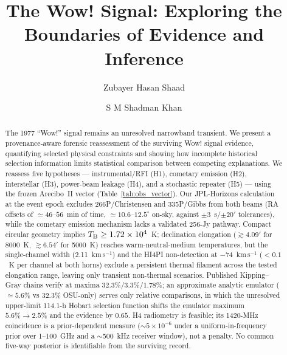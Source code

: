 \documentclass[twocolumn]{aastex701}
\newcommand{\tbeq}{T_{\rm B}}
\begin{document}
\title{The Wow! Signal: Exploring the Boundaries of Evidence and Inference}


\author[sname=Shaad,gname=Zubayer,orcid=0009-0002-2322-8553]{Zubayer Hasan Shaad}

\author[sname=Shadman,gname=Khan,orcid=0009-0009-8153-6352]{S M Shadman Khan}


\begin{abstract}
The 1977 ``Wow!'' signal remains an unresolved narrowband transient. We present a provenance-aware forensic reassessment of the surviving Wow! signal evidence, quantifying selected physical constraints and showing how incomplete historical selection information limits statistical comparison between competing explanations. We reassess five hypotheses --- instrumental/RFI (H1), cometary emission (H2), interstellar  (H3), power-beam leakage (H4), and a stochastic repeater (H5) --- using the frozen Arecibo~II vector \citep{mendez2025} (Table~\ref{tab:obs_vector}). Our JPL-Horizons calculation at the event epoch excludes 266P/Christensen and 335P/Gibbs from both beams (RA offsets of $\simeq46$--$56$~min of time, $\simeq10.6$--$12.5^\circ$ on-sky, against $\pm3$~s/$\pm20'$ tolerances), while the cometary emission mechanism lacks a validated 256-Jy pathway. Compact circular geometry implies $\tbeq\geq1.72\times10^4$~K; declination elongation ($\gtrsim4.09'$ for 8000~K, $\gtrsim6.54'$ for 5000~K) reaches warm-neutral-medium temperatures, but the single-channel width (2.11~km\,s$^{-1}$) and the HI4PI non-detection at $-74$~km\,s$^{-1}$ ($<0.1$~K per channel at both horns) exclude a persistent thermal filament across the tested elongation range, leaving only transient non-thermal scenarios. Published Kipping--Gray chains verify at maxima $32.3\%$/$3.3\%$/$1.78\%$; an approximate analytic emulator ($\simeq5.6\%$ vs $32.3\%$ OSU-only) serves only relative comparisons, in which the unresolved upper-limit 114.1-h Hobart selection function shifts the emulator maximum $5.6\%\to2.5\%$ and the evidence by $0.65$. H4 radiometry is feasible; its 1420-MHz coincidence is a prior-dependent measure ($\sim$$5\times10^{-6}$ under a uniform-in-frequency prior over 1--100~GHz and a $\sim$500~kHz receiver window), not a penalty. No common five-way posterior is identifiable from the surviving record.
\end{abstract}
\end{document}
